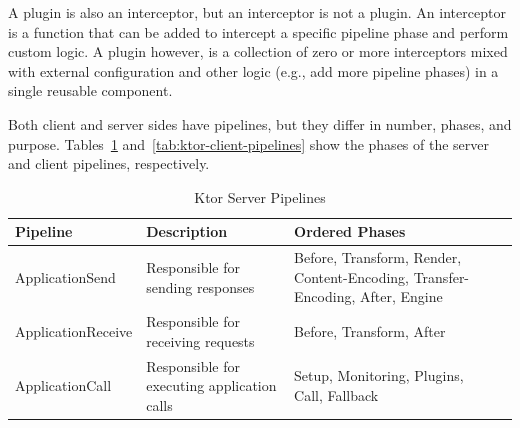 A plugin is also an interceptor, but an interceptor is not a plugin.
An interceptor is a function that can be added to intercept a specific pipeline phase and perform custom logic.
A plugin however, is a collection of zero or more interceptors mixed with external configuration and other logic
(e.g., add more pipeline phases) in a single reusable component.

Both client and server sides have pipelines, but they differ in number, phases, and purpose.
Tables~\ref{tab:ktor-server-pipelines} and~\ref{tab:ktor-client-pipelines} show the phases of the server and client pipelines, respectively.

\begin{table}[!htb]
    \centering
    \caption{Ktor Server Pipelines}
    \label{tab:ktor-server-pipelines}
    \vspace{0.3cm}
    \begin{tabular}{|l|p{6cm}|p{5cm}|p{5cm}|}
        \hline
        \textbf{Pipeline}  & \textbf{Description}                        & \textbf{Ordered Phases}                                                       \\ \hline
        ApplicationSend    & Responsible for sending responses           & Before, Transform, Render, Content-Encoding, Transfer-Encoding, After, Engine \\ \hline
        ApplicationReceive & Responsible for receiving requests          & Before, Transform, After                                                      \\ \hline
        ApplicationCall    & Responsible for executing application calls & Setup, Monitoring, Plugins, Call, Fallback                                    \\ \hline
    \end{tabular}
\end{table}

